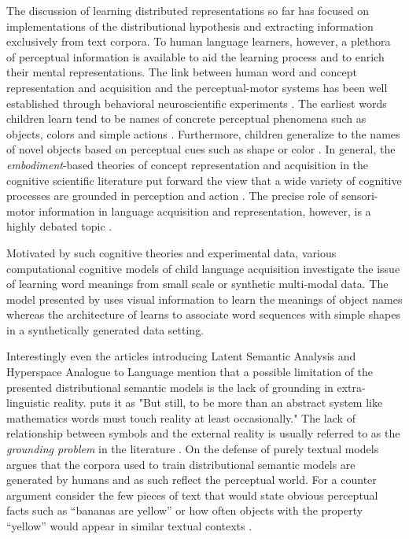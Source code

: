 The discussion of learning distributed representations so far has focused on
implementations of the distributional hypothesis and extracting information exclusively
from text corpora. To human language learners, however, a plethora of
perceptual information is available to aid the
learning process and to enrich their mental representations.
The link between human word and concept representation
and acquisition and the perceptual-motor systems has been well established through behavioral
neuroscientific experiments \citep{pulvermuller2005brain}.
The earliest words children learn tend to be names of concrete perceptual phenomena
such as objects, colors and simple actions \citep{bornstein2004cross}. Furthermore, children generalize to
the names of novel objects based on perceptual cues such as shape or color \citep{landau1998object}.
In general, the \emph{embodiment}-based theories of concept representation and acquisition in the
cognitive scientific literature put forward the view that a wide variety of cognitive processes
are grounded in perception and action \citep{meteyard2008role}. The precise role of
sensori-motor information in language acquisition and representation, however, is a highly
debated topic \citep{meteyard2012coming}.

Motivated by such cognitive theories and experimental data,
various computational cognitive models of child
language acquisition investigate the issue
of learning word meanings from small scale or synthetic multi-modal data. The model presented by
\cite{yu2005emergence} uses visual information to learn the meanings of object
names whereas the architecture of \cite{roy2002learning} learns to associate word sequences
with simple shapes in a synthetically generated data setting.

Interestingly even the articles introducing Latent Semantic Analysis
\citep{landauer1997solution} and Hyperspace Analogue to Language \citep{lund1996producing} mention
that a possible limitation of the presented distributional semantic models is the lack of
grounding in extra-linguistic reality. \cite{landauer1997solution} puts it as "But still, to be more than
an abstract system like mathematics words must touch reality at least occasionally."
The lack of relationship between symbols and the external reality is usually referred
to as the \emph{grounding problem} in the literature \citep{harnad1990symbol,perfetti1998limits}.
On the defense of purely textual models \cite{louwerse2011symbol} argues that the corpora
used to train distributional semantic models are generated by humans and as such reflect the perceptual world.
For a counter argument consider the few pieces of text that would state obvious perceptual
facts such as ``bananas are yellow'' or how often objects with the property ``yellow''
would appear in similar textual contexts \citep{bruni2014multimodal}.

